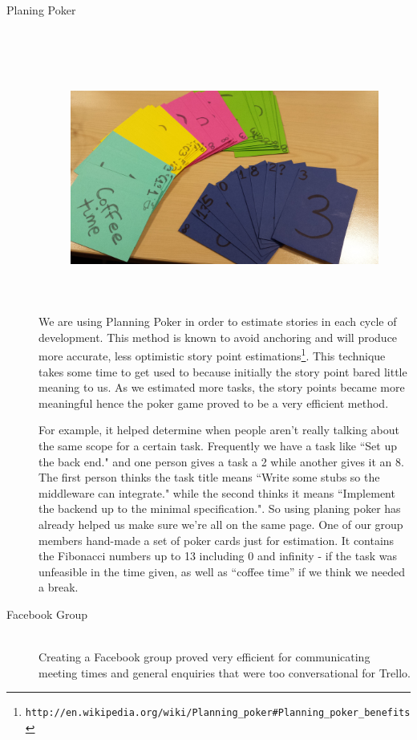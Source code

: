 \documentclass[11pt, a4paper]{article}
\begin{document}
\begin{description}
\item[Planing Poker] \hfill \\
\begin{figure}[h!]
\centering
\includegraphics[height=80mm,width=130mm]{planningPokers.jpg}
\end{figure}

We are using Planning Poker in order to estimate stories in each cycle of development. 
This method is known to avoid anchoring and will produce more accurate, less optimistic story point estimations\footnote{\tt{http://en.wikipedia.org/wiki/Planning\_poker\#Planning\_poker\_benefits}}. This technique takes some time to get used to because initially the story point bared little meaning to us.
As we estimated more tasks, the story points became more meaningful hence the poker game proved to be a very efficient method.

For example, it helped determine when people aren't really talking about the same scope for a certain task.
Frequently we have a task like ``Set up the back end." and one person gives a task a 2 while another gives it an 8.
The first person thinks the task title means ``Write some stubs so the middleware can integrate." while the second thinks it means ``Implement the backend up to the minimal specification.". 
So using planing poker has already helped us make sure we're all on the same page.
One of our group members hand-made a set of poker cards just for estimation.
It contains the Fibonacci numbers up to 13 including 0 and infinity - if the task was unfeasible in the time given, as well as ``coffee time'' if we think we needed a break. 

\item[Facebook Group] \hfill \\
Creating a Facebook group proved very efficient for communicating meeting times and general enquiries that were too conversational for Trello.  


\end{description}
\end{document}
